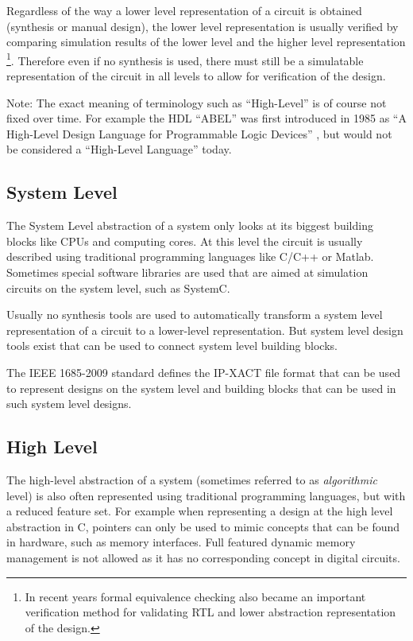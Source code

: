 Regardless of the way a lower level representation of a circuit is
obtained (synthesis or manual design), the lower level representation is usually
verified by comparing simulation results of the lower level and the higher level
representation \footnote{In recent years formal equivalence 
checking also became an important verification method for validating RTL and 
lower abstraction representation of the design.}.
Therefore even if no synthesis is used, there must still be a simulatable
representation of the circuit in all levels to allow for verification of the
design.

Note: The exact meaning of terminology such as ``High-Level'' is of course not
fixed over time. For example the HDL ``ABEL'' was first introduced in 1985 as ``A High-Level
Design Language for Programmable Logic Devices'' \cite{ABEL}, but would not
be considered a ``High-Level Language'' today.

\subsection{System Level}

The System Level abstraction of a system only looks at its biggest building
blocks like CPUs and computing cores. At this level the circuit is usually described
using traditional programming languages like C/C++ or Matlab. Sometimes special
software libraries are used that are aimed at simulation circuits on the system
level, such as SystemC.

Usually no synthesis tools are used to automatically transform a system level
representation of a circuit to a lower-level representation. But system level
design tools exist that can be used to connect system level building blocks.

The IEEE 1685-2009 standard defines the IP-XACT file format that can be used to
represent designs on the system level and building blocks that can be used in
such system level designs. \cite{IP-XACT}

\subsection{High Level}

The high-level abstraction of a system (sometimes referred to as {\it
algorithmic} level) is also often represented using traditional programming
languages, but with a reduced feature set. For example when representing a
design at the high level abstraction in C, pointers can only be used to mimic
concepts that can be found in hardware, such as memory interfaces. Full
featured dynamic memory management is not allowed as it has no corresponding
concept in digital circuits.

